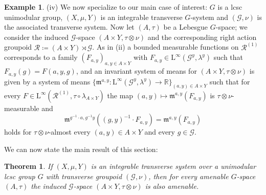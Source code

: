\documentclass[11pt, oneside]{amsart}
\newtheorem{thm}[lemma]{Theorem}
\theoremstyle{definition}
\newtheorem{example}[lemma]{Example}
\theoremstyle{remark}
\theoremstyle{TheoremNum}
\renewcommand{\L}{\mathfrak}
\newcommand{\Linf}{\mathrm{L}^{\infty}}
\newcommand{\cG}{\mathcal{G}}
\newcommand{\cR}{\mathcal{R}}
\begin{document}
\begin{example}
\item (iv) We now specialize to our main case of interest: $G$ is a lcsc unimodular group, $(X, \mu, Y)$ is an integrable transverse $G$-system and $(\cG, \nu)$ is the associated transverse system. Now let $(A, \tau)$ be a Lebesgue $G$-space; we consider the induced $\cG$-space $(A \times Y, \tau \otimes \nu)$ and the corresponding right action groupoid $\cR \coloneqq (A \times Y) \rtimes \cG$. As in (ii) a bounded measurable functions on $\cR^{(1)}$ corresponds to a family $(F_{a,y})_{a,y \in A \times Y}$ with $F_{a,y} \in \Linf(\cG^y, \lambda^y)$ such that $F_{a,y}(g) = F(a,y,g)$, and an invariant system of means for $(A \times Y, \tau \otimes \nu)$ is given by a system of means $\{\L m^{a,y}:\Linf(\mathcal{G}^{y},\lambda^y)\to \mathbb{R}\}_{(a,y)\in A\times Y}$ such that for every $F \in \Linf(\cR^{(1)}, \tau \circ \lambda_{A \times Y})$
the map $(a,y) \mapsto  \L m^{a,y}(F_{a,y})$ is $\tau \otimes \nu$-measurable and 
  \begin{equation}\label{eq:ISM:action:AxY}
    \L m^{g^{-1}\cdot a,g^{-1}y} ((g, y)^{-1}\cdot F_{a,y}) = \L m^{ a,y}(F_{a,y}) 
  \end{equation}
  holds for $\tau\otimes \nu$-almost every $(a,y)\in A\times Y$ and every $g\in\mathcal{G}$.
\end{example}
We can now state the main result of this section:
\begin{thm}\label{InducedAmenable} If $(X, \mu, Y)$ is an integrable transverse system over a unimodular lcsc group $G$ with transverse groupoid $(\cG, \nu)$, then for every amenable $G$-space
$(A,\tau)$ the induced $\cG$-space  $(A\times Y,\tau\otimes \nu)$ is also amenable.
\end{thm}
\end{document}
